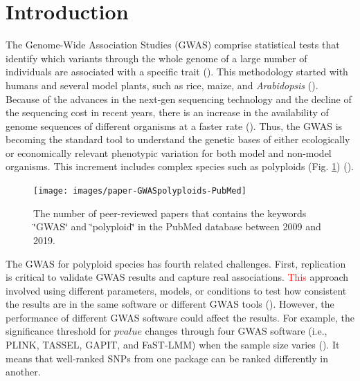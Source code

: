 \documentclass{article}
\begin{document}
\maketitle 

\section{Introduction}
The Genome-Wide Association Studies (GWAS) comprise statistical tests that identify which variants through the whole genome of a large number of individuals are associated with a specific trait (\cite{cantor2010prioritizing,begum2012comprehensive}). This methodology started with humans and several model plants, such as rice, maize, and \emph{Arabidopsis} (\cite{lauc2010genomics,tian2011genome,cao2011whole,korte2013advantages,han2013sequencing}). Because of the advances in the next-gen sequencing technology and the decline of the sequencing cost in recent years, there is an increase in the availability of genome sequences of different organisms at a faster rate (\cite{ekblom2011applications,ellegren2014genome}). Thus, the GWAS is becoming the standard tool to understand the genetic bases of either ecologically or economically relevant phenotypic variation for both model and non-model organisms. This increment includes complex species such as polyploids (Fig. \ref{GWASpolyploids}) (\cite{ekblom2011applications,santure2018wild}).

\begin{figure}[H]
\begin{centering}
\texttt{[image: images/paper-GWASpolyploids-PubMed]} 
\par\end{centering}
\caption{The number of peer-reviewed papers that contains the keywords \char`\"{}GWAS\char`\"{} and \char`\"{}polyploid\char`\"{} in the PubMed database between 2009 and 2019.\label{GWASpolyploids}}
\end{figure}

The GWAS for polyploid species has fourth related challenges. First, replication is critical to validate GWAS results and capture real associations. \textcolor{red}{This} approach involved using different parameters, models, or conditions to test how consistent the results are in the same software or different GWAS tools (\cite{De2014,Pearson2008}). However, the performance of different GWAS software could affect the results. For example, the significance threshold for $pvalue$ changes through four GWAS software (i.e., PLINK, TASSEL, GAPIT, and FaST-LMM) when the sample size varies (\cite{Yan2019}). It means that well-ranked SNPs from one package can be ranked differently in another.
\end{document}
